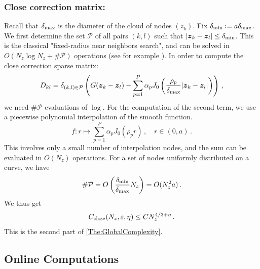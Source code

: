 \documentclass[smallextended]{svjour3}
\begin{document}
\subsubsection{Close correction matrix:} 
Recall that $\delta_{\max}$ is the diameter of the cloud of nodes $(z_k)$. 
Fix $\delta_{\min} \mathrel{\mathop:}= a \delta_{\max}$. We first determine the set $\mathcal{P}$ of all pairs $(k,l)$ such that $\left\lvert \boldsymbol{z}_k - \boldsymbol{z}_l \right\rvert \leq \delta_{\min}$. This is the classical "fixed-radius near neighbors search", and can be solved in $O(N_z \log N_z + \# \mathcal{P})$ operations (see for example \cite{bentley1975multidimensional, bentley1977complexity,turau1991fixed,dickerson1990fixed}). In order to compute the close correction sparse matrix:
\[
D_{kl} = \delta_{(k,l) \in \mathcal{P}} \left( G({\boldsymbol{z}_k - \boldsymbol{z}_l}) - \sum_{p = 1}^{P} \alpha_p J_0\left(\frac{\rho_p}{\delta_{\max}} |\boldsymbol{z}_k - \boldsymbol{z}_l|\right)\right)\,,
\]
we need $\#\mathcal{P}$ evaluations of $\log$. For the computation of the second term, we use a piecewise polynomial interpolation of the smooth function.
\[f: r \mapsto \sum_{p = 1}^{P} \alpha_p J_0(\rho_pr)\,, \quad r \in (0,a)\,.\]
This involves only a small number of interpolation nodes, and the sum can be evaluated in $O(N_z)$ operations. For a set of nodes uniformly distributed on a curve, we have
\begin{equation}
	\label{eq:NombreDinteractionsProches}
	\# \mathcal{P} = O\left(\dfrac{\delta_{\min}}{\delta_{\max}} N_z\right) = O(N_z^2 a)\,.
\end{equation}
We thus get
\begin{equation}
	\label{Complex:assemble}
	C_{\textup{close}}(N_z,\varepsilon,\eta) \leq C N_z^{4/3 + \eta}\,.
\end{equation}
This is the second part of \autoref{The:GlobalComplexity}. 
\subsection{Online Computations}
\end{document}
